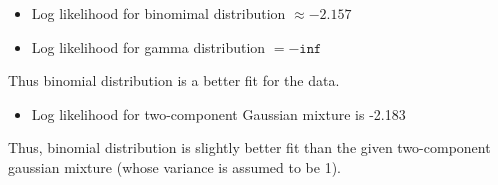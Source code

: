 \begin{solution}
	\begin{itemize}
		\item Log likelihood for binomimal distribution $\approx -2.157$
		\item Log likelihood for gamma distribution $= -\texttt{inf}$
	\end{itemize}
	Thus binomial distribution is a better fit for the data.

	\begin{itemize}
		\item Log likelihood for two-component Gaussian mixture is -2.183
	\end{itemize}
	Thus, binomial distribution is slightly better fit than the given two-component gaussian mixture (whose variance is assumed to be 1).
\end{solution}
